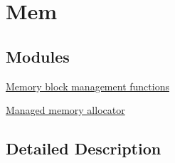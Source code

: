 \hypertarget{group__mem}{}\section{Mem}
\label{group__mem}
\subsection*{Modules}
\begin{DoxyCompactItemize}
\item 
\hyperlink{group__memb}{Memory block management functions}
\item 
\hyperlink{group__mmem}{Managed memory allocator}
\end{DoxyCompactItemize}


\subsection{Detailed Description}
